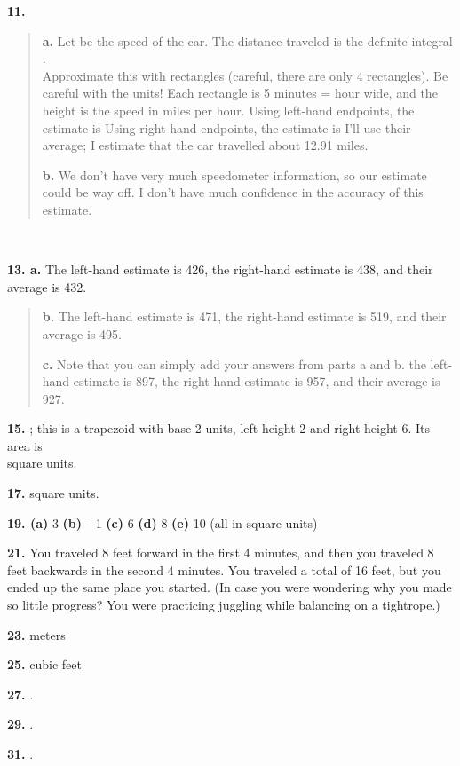 \textbf{11. }

\begin{quote}
\textbf{a.} Let be the speed of the car. The distance traveled is the
definite integral .\\
Approximate this with rectangles (careful, there are only 4 rectangles).
Be careful with the units! Each rectangle is 5 minutes = hour wide, and
the height is the speed in miles per hour. Using left-hand endpoints,
the estimate is Using right-hand endpoints, the estimate is I'll use
their average; I estimate that the car travelled about 12.91 miles.

\textbf{b.} We don't have very much speedometer information, so our
estimate could be way off. I don't have much confidence in the accuracy
of this estimate.
\end{quote}

\textbf{\\
}

\textbf{13. a.} The left-hand estimate is 426, the right-hand estimate
is 438, and their average is 432.

\begin{quote}
\textbf{b.} The left-hand estimate is 471, the right-hand estimate is
519, and their average is 495.

\textbf{c.} Note that you can simply add your answers from parts a and
b. the left-hand estimate is 897, the right-hand estimate is 957, and
their average is 927.
\end{quote}

\textbf{15.} ; this is a trapezoid with base 2 units, left height 2 and
right height 6. Its area is\\
square units.

\textbf{17.} square units.

\textbf{19. (a)} 3 \textbf{(b)} −1 \textbf{(c)} 6 \textbf{(d)} 8
\textbf{(e)} 10 (all in square units)

\textbf{21.} You traveled 8 feet forward in the first 4 minutes, and
then you traveled 8 feet backwards in the second 4 minutes. You traveled
a total of 16 feet, but you ended up the same place you started. (In
case you were wondering why you made so little progress? You were
practicing juggling while balancing on a tightrope.)

\textbf{23.} meters

\textbf{25.} cubic feet

\textbf{27.} .

\textbf{29.} .

\textbf{31.} .


